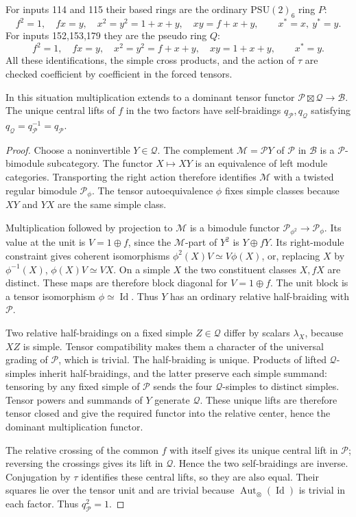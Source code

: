 For inputs 114 and 115 their based rings are the ordinary
$\mathrm{PSU}(2)_6$ ring $P$:
\[
 f^2=1,\quad fx=y,\quad
 x^2=y^2=1+x+y,\quad xy=f+x+y,
 \qquad x^*=x,\ y^*=y.
\]
For inputs 152,153,179 they are the pseudo ring $Q$:
\[
 f^2=1,\quad fx=y,\quad
 x^2=y^2=f+x+y,\quad xy=1+x+y,
 \qquad x^*=y.
\]
All these identifications, the simple cross products, and the action of
$\tau$ are checked coefficient by coefficient in the forced tensors.

\begin{lemma}\label{lem:relative-factor}
In this situation multiplication extends to a dominant tensor functor
$\mathcal P\boxtimes\mathcal Q\longrightarrow\mathcal B$.
The unique central lifts of $f$ in the two factors have self-braidings
$q_{\mathcal P},q_{\mathcal Q}$ satisfying
$q_{\mathcal Q}=q_{\mathcal P}^{-1}=q_{\mathcal P}$.
\end{lemma}
\begin{proof}
Choose a noninvertible $Y\in\mathcal Q$. The complement
$\mathcal M=\mathcal P Y$ of $\mathcal P$ in $\mathcal B$ is a
$\mathcal P$-bimodule subcategory. The functor $X\mapsto XY$ is an
equivalence of left module categories. Transporting the right action
therefore identifies $\mathcal M$ with a twisted regular bimodule
$\mathcal P_\phi$. The tensor autoequivalence $\phi$ fixes simple
classes because $XY$ and $YX$ are the same simple class.

Multiplication followed by projection to $\mathcal M$ is a bimodule
functor $\mathcal P_{\phi^2}\to\mathcal P_\phi$. Its value at the
unit is $V=1\oplus f$, since the $\mathcal M$-part of $Y^2$ is
$Y\oplus fY$. Its right-module constraint gives coherent isomorphisms
$\phi^2(X)V\simeq V\phi(X)$, or, replacing $X$ by $\phi^{-1}(X)$,
$\phi(X)V\simeq VX$. On a simple $X$ the two constituent classes
$X,fX$ are distinct. These maps are therefore block diagonal for
$V=1\oplus f$. The unit block is a tensor isomorphism
$\phi\simeq\operatorname{Id}$. Thus $Y$ has an ordinary relative
half-braiding with $\mathcal P$.

Two relative half-braidings on a fixed simple $Z\in\mathcal Q$ differ
by scalars $\lambda_X$, because $XZ$ is simple. Tensor compatibility
makes them a character of the universal grading of $\mathcal P$,
which is trivial. The half-braiding is unique. Products of lifted
$\mathcal Q$-simples inherit half-braidings, and the latter preserve
each simple summand: tensoring by any fixed simple of $\mathcal P$
sends the four $\mathcal Q$-simples to distinct simples. Tensor powers
and summands of $Y$ generate $\mathcal Q$. These unique lifts are
therefore tensor closed and give the required functor into the relative
center, hence the dominant multiplication functor.

The relative crossing of the common $f$ with itself gives its unique
central lift in $\mathcal P$; reversing the crossings gives its lift
in $\mathcal Q$. Hence the two self-braidings are inverse.
Conjugation by $\tau$ identifies these central lifts, so they are also
equal. Their squares lie over the tensor unit and are trivial because
$\operatorname{Aut}_{\otimes}(\operatorname{Id})$ is trivial in each
factor. Thus $q_{\mathcal P}^2=1$.
\end{proof}

